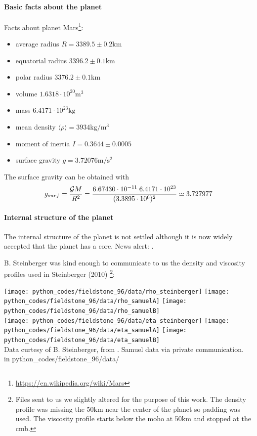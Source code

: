 \paragraph{Basic facts about the planet}

Facts about planet Mars\footnote{\url{https://en.wikipedia.org/wiki/Mars}}:
\begin{itemize}
\item average radius $R=3389.5 \pm 0.2 \si{\km}$
\item equatorial radius $3396.2 \pm 0.1 \si{\km}$
\item polar radius $3376.2 \pm 0.1 \si{\km}$
\item volume $1.6318 \cdot 10^{20} \si{\cubic\metre}$
\item mass $6.4171 \cdot 10^{23}\si{\kilo\gram}$
\item mean density $\langle\rho\rangle= 3934\si{\kilo\gram\per\cubic\meter}$
\item moment of inertia $I=0.3644 \pm 0.0005$
\item surface gravity $g=3.72076 \si{\metre\per\square\second}$
\end{itemize}

The surface gravity can be obtained with 
\[
g_{surf}=\frac{{\cal G} M}{R^2} 
=\frac{6.67430 \cdot 10^{-11} \; 6.4171 \cdot 10^{23} }{(3.3895\cdot 10^6)^2}
\simeq 3.727977
\]

\paragraph{Internal structure of the planet}

The internal structure of the planet is not settled although 
it is now widely accepted that the planet has a core. News alert: \cite{khcv21,stkb21,knpb21}. 

B. Steinberger was kind enough to communicate to us the density and viscosity 
profiles used in Steinberger \etal (2010) \cite{stwt10} \footnote{Files sent to us 
we slightly altered for the purpose of this work. The density profile was missing 
the 50km near the center of the planet so padding was used. The viscosity profile 
starts below the moho at 50\si{\km} and stopped at the cmb.}:

\begin{center}
\texttt{[image: python\_codes/fieldstone\_96/data/rho\_steinberger]}
\texttt{[image: python\_codes/fieldstone\_96/data/rho\_samuelA]}
\texttt{[image: python\_codes/fieldstone\_96/data/rho\_samuelB]}\\
\texttt{[image: python\_codes/fieldstone\_96/data/eta\_steinberger]}
\texttt{[image: python\_codes/fieldstone\_96/data/eta\_samuelA]}
\texttt{[image: python\_codes/fieldstone\_96/data/eta\_samuelB]}\\
{\captionfont Data curtesy of B. Steinberger, from \cite{stwt10}.
Samuel data via private communication.} \\
{\tiny {\color{gray} in python\_codes/fieldstone\_96/data/}}
\end{center}

